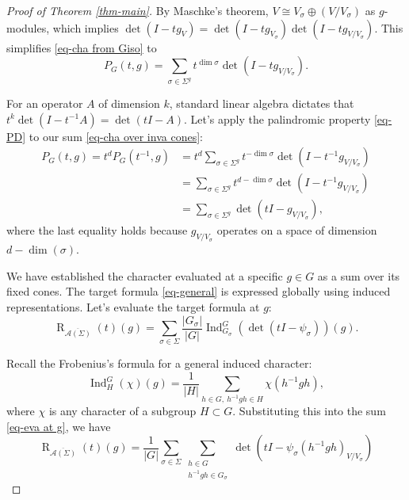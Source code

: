 \documentclass[10pt,a4paper]{amsart}
\begin{document}
\begin{proof}[Proof of Theorem \ref{thm-main}]
By Maschke's theorem, $V \cong V_\sigma \oplus (V/V_\sigma)$ as $g$-modules, which implies $\operatorname{det}(I - t g_V) = \operatorname{det}(I - t g_{V_\sigma}) \operatorname{det}(I - t g_{V/V_\sigma})$. This simplifies \eqref{eq-cha from Giso} to
\begin{equation} \label{eq-cha over inva cones}
P_G(t, g) = \sum_{\sigma \in \Sigma^g} t^{\dim \sigma} \operatorname{det}(I - t g_{V/V_\sigma}).
\end{equation} 

For an operator $A$ of dimension $k$, standard linear algebra dictates that $t^k \operatorname{det}(I - t^{-1}A) = \operatorname{det}(tI - A)$. Let's apply the palindromic property \eqref{eq-PD} to our sum \eqref{eq-cha over inva cones}:
\begin{equation} \label{eq-reverse}
    \begin{aligned}
P_G(t, g)=t^d P_G(t^{-1}, g) &= t^d \sum_{\sigma \in \Sigma^g} t^{-\dim \sigma} \operatorname{det}(I - t^{-1} g_{V/V_\sigma}) \\
&= \sum_{\sigma \in \Sigma^g} t^{d - \dim \sigma} \operatorname{det}(I - t^{-1} g_{V/V_\sigma}) \\
&= \sum_{\sigma \in \Sigma^g} \operatorname{det}(t I - g_{V/V_\sigma}),
\end{aligned} 
\end{equation}
where the last equality holds because $g_{V/V_\sigma}$ operates on a space of dimension $d - \dim(\sigma)$. 

We have established the character evaluated at a specific $g \in G$ as a sum over its fixed cones. The target formula \eqref{eq-general} is expressed globally using induced representations. Let's evaluate the target formula at $g$:
\begin{equation} \label{eq-eva at g}
\operatorname{R}_{\overline{\mathcal{A}(\Sigma)}}(t)(g) = \sum_{\sigma \in \Sigma} \frac{|G_\sigma|}{|G|} \operatorname{Ind}_{G_\sigma}^G \left(\operatorname{det}(tI-\psi_\sigma)\right)(g).    
\end{equation}  

Recall the Frobenius's formula for a general induced character: $$\operatorname{Ind}_{H}^G(\chi)(g) = \frac{1}{|H|} \sum_{h \in G, \ h^{-1}gh \in H} \chi(h^{-1}gh),$$
where $\chi$ is any character of a subgroup $H\subset G$.
Substituting this into the sum \eqref{eq-eva at g}, we have
\begin{equation} \label{eq-double}
\operatorname{R}_{\overline{\mathcal{A}(\Sigma)}}(t)(g) = \frac{1}{|G|} \sum_{\sigma \in \Sigma} \sum_{\substack{h \in G \\ h^{-1}gh \in G_\sigma}} \operatorname{det}(tI - \psi_\sigma(h^{-1}gh)_{V/V_\sigma})   
\end{equation}


\end{proof}
\end{document}
